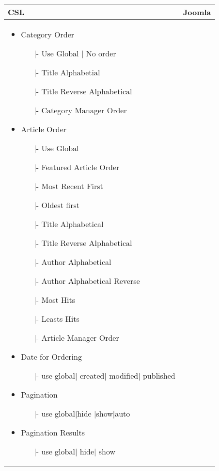 \begin{minipage}{0.7\textwidth}
\begin{tabular}{|p{} | p{}|}
\hline
\textbf{CSL} & \textbf{Joomla} \\ 
\hline
\begin{itemize}
\item Category Order
	\begin{enumerate}
		\item[|-] Use Global | No order
		\item[|-] Title Alphabetial
		\item[|-] Title Reverse Alphabetical
		\item[|-] Category Manager Order
	\end{enumerate}
\item  Article Order
	\begin{enumerate}
		\item[|-] Use Global
		\item[|-] Featured Article Order
		\item[|-] Most Recent First
		\item[|-] Oldest first
		\item[|-] Title Alphabetical
		\item[|-] Title Reverse Alphabetical
		\item[|-] Author Alphabetical
		\item[|-] Author Alphabetical Reverse
		\item[|-] Most Hits 
		\item[|-] Leasts Hits
		\item[|-] Article Manager Order 
	\end{enumerate}
\item Date for Ordering
	 \begin{enumerate}
	 \item[|-]use global| created| modified| published
	 \end{enumerate}
\item Pagination
	 \begin{enumerate}
	 	 \item[|-]use global|hide |show|auto
	 \end{enumerate}
\item Pagination Results
	\begin{enumerate}
	\item[|-]use global| hide| show
	\end{enumerate}
\end{itemize}
& 
\begin{itemize}

\end{itemize}
\end{tabular}
\end{minipage}
